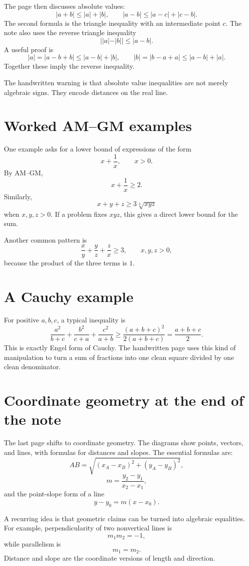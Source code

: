 The page then discusses absolute values:
\[
  |a+b|\le |a|+|b|,\qquad
  |a-b|\le |a-c|+|c-b|.
\]
The second formula is the triangle inequality with an intermediate point $c$.  The note also uses the reverse triangle inequality
\[
  ||a|-|b||\le |a-b|.
\]
A useful proof is
\[
  |a|=|a-b+b|\le |a-b|+|b|,\qquad
  |b|=|b-a+a|\le |a-b|+|a|.
\]
Together these imply the reverse inequality.

The handwritten warning is that absolute value inequalities are not merely algebraic signs.  They encode distances on the real line.

\section{Worked AM--GM examples}

One example asks for a lower bound of expressions of the form
\[
  x+\frac1x,\qquad x>0.
\]
By AM--GM,
\[
  x+\frac1x\ge2.
\]
Similarly,
\[
  x+y+z\ge3\sqrt[3]{xyz}
\]
when $x,y,z>0$.  If a problem fixes $xyz$, this gives a direct lower bound for the sum.

Another common pattern is
\[
  \frac{x}{y}+\frac{y}{z}+\frac{z}{x}\ge3,\qquad x,y,z>0,
\]
because the product of the three terms is $1$.

\section{A Cauchy example}

For positive $a,b,c$, a typical inequality is
\[
  \frac{a^2}{b+c}+\frac{b^2}{c+a}+\frac{c^2}{a+b}
  \ge
  \frac{(a+b+c)^2}{2(a+b+c)}
  =\frac{a+b+c}{2}.
\]
This is exactly Engel form of Cauchy.  The handwritten page uses this kind of manipulation to turn a sum of fractions into one clean square divided by one clean denominator.

\section{Coordinate geometry at the end of the note}

The last page shifts to coordinate geometry.  The diagrams show points, vectors, and lines, with formulas for distances and slopes.  The essential formulas are:
\[
  AB=\sqrt{(x_A-x_B)^2+(y_A-y_B)^2},
\]
\[
  m=\frac{y_2-y_1}{x_2-x_1},
\]
and the point-slope form of a line
\[
  y-y_0=m(x-x_0).
\]

A recurring idea is that geometric claims can be turned into algebraic equalities.  For example, perpendicularity of two nonvertical lines is
\[
  m_1m_2=-1,
\]
while parallelism is
\[
  m_1=m_2.
\]
Distance and slope are the coordinate versions of length and direction.


